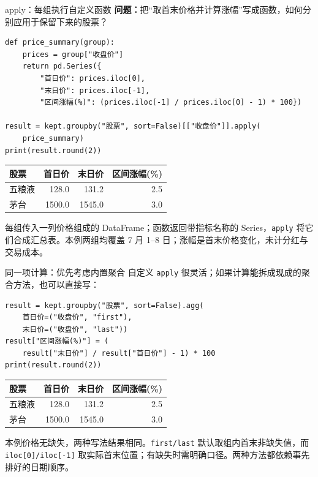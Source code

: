 \documentclass[9pt]{ctexbeamer}
\begin{document}
\begin{frame}[fragile]{apply：每组执行自定义函数}
\small \textbf{问题：}把“取首末价格并计算涨幅”写成函数，如何分别应用于保留下来的股票？
\begin{lstlisting}[basicstyle=\ttfamily\scriptsize]
def price_summary(group):
    prices = group["收盘价"]
    return pd.Series({
        "首日价": prices.iloc[0],
        "末日价": prices.iloc[-1],
        "区间涨幅(%)": (prices.iloc[-1] / prices.iloc[0] - 1) * 100})

result = kept.groupby("股票", sort=False)[["收盘价"]].apply(
    price_summary)
print(result.round(2))
\end{lstlisting}
\begin{center}
\small
\begin{tabular}{lrrr}
\toprule
股票 & 首日价 & 末日价 & 区间涨幅(\%) \\
\midrule
五粮液 & 128.0 & 131.2 & 2.5 \\
茅台 & 1500.0 & 1545.0 & 3.0 \\
\bottomrule
\end{tabular}
\end{center}
\small 每组传入一列价格组成的 DataFrame；函数返回带指标名称的 Series，\texttt{apply} 将它们合成汇总表。本例两组均覆盖 7 月 1--8 日；涨幅是首末价格变化，未计分红与交易成本。
\end{frame}

\begin{frame}[fragile]{同一项计算：优先考虑内置聚合}
\small 自定义 \texttt{apply} 很灵活；如果计算能拆成现成的聚合方法，也可以直接写：
\begin{lstlisting}
result = kept.groupby("股票", sort=False).agg(
    首日价=("收盘价", "first"),
    末日价=("收盘价", "last"))
result["区间涨幅(%)"] = (
    result["末日价"] / result["首日价"] - 1) * 100
print(result.round(2))
\end{lstlisting}
\begin{center}
\small
\begin{tabular}{lrrr}
\toprule
股票 & 首日价 & 末日价 & 区间涨幅(\%) \\
\midrule
五粮液 & 128.0 & 131.2 & 2.5 \\
茅台 & 1500.0 & 1545.0 & 3.0 \\
\bottomrule
\end{tabular}
\end{center}
\small 本例价格无缺失，两种写法结果相同。\texttt{first/last} 默认取组内首末非缺失值，而 \texttt{iloc[0]/iloc[-1]} 取实际首末位置；有缺失时需明确口径。两种方法都依赖事先排好的日期顺序。
\end{frame}
\end{document}
